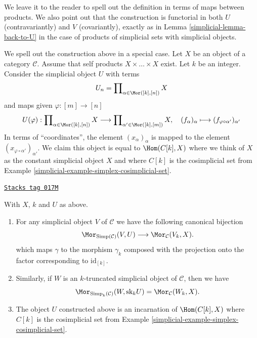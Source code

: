 We leave it to the reader to spell out the
definition in terms of maps between products.
We also point out that the construction is functorial
in both $U$ (contravariantly) and $V$ (covariantly), exactly as in
Lemma \ref{simplicial-lemma-back-to-U} in the case of
products of simplicial sets with simplicial objects.

\medskip\noindent
We spell out the construction above in a special case.
Let $X$ be an object of a category $\mathcal{C}$.
Assume that self products $X \times \ldots \times X$ exist.
Let $k$ be an integer.
Consider the simplicial object $U$ with terms
$$
U_n = \prod\nolimits_{\alpha \in \Mor([k], [n])} X
$$
and maps given $\varphi : [m] \to [n]$
$$
U(\varphi) :
\prod\nolimits_{\alpha \in \Mor([k], [n])} X
\longrightarrow
\prod\nolimits_{\alpha' \in \Mor([k], [m])} X, \quad
(f_{\alpha})_{\alpha} \longmapsto
(f_{\varphi \circ \alpha'})_{\alpha'}
$$
In terms of ``coordinates'', the element $(x_\alpha)_\alpha$
is mapped to the element $(x_{\varphi \circ \alpha'})_{\alpha'}$.
We claim this object is equal to $\Hom(C[k], X)$
where we think of $X$ as the constant simplicial object $X$
and where $C[k]$ is the cosimplicial set from
Example \ref{simplicial-example-simplex-cosimplicial-set}.

\begin{lemma}
\label{simplicial-lemma-morphism-into-product}
\href{https://stacks.math.columbia.edu/tag/017M}{\texttt{Stacks tag 017M}}

With $X$, $k$ and $U$ as above.
\begin{enumerate}
\item For any simplicial object $V$ of
$\mathcal{C}$ we have the following
canonical bijection
$$
\Mor_{\text{Simp}(\mathcal{C})}(V, U)
\longrightarrow
\Mor_\mathcal{C}(V_k, X).
$$
which maps $\gamma$ to the morphism $\gamma_k$ composed with
the projection onto the factor corresponding to $\text{id}_{[k]}$.
\item Similarly, if $W$ is an $k$-truncated simplicial object
of $\mathcal{C}$, then we have
$$
\Mor_{\text{Simp}_k(\mathcal{C})}(W, \text{sk}_k U)
=
\Mor_\mathcal{C}(W_k, X).
$$
\item The object $U$ constructed above is an
incarnation of $\Hom(C[k], X)$ where $C[k]$ is the cosimplicial set from
Example \ref{simplicial-example-simplex-cosimplicial-set}.
\end{enumerate}
\end{lemma}

